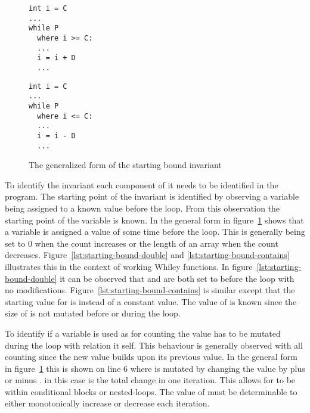 \begin{figure}[ht]
\noindent\begin{minipage}{.45\textwidth}
\begin{lstlisting}
int i = C
...
while P
  where i >= C:
  ... 
  i = i + D
  ...
\end{lstlisting}

\end{minipage}\hfill
\begin{minipage}{.45\textwidth}
\begin{lstlisting}
int i = C
...
while P
  where i <= C:
  ... 
  i = i - D
  ...
\end{lstlisting}	
\end{minipage}\hfill
\caption{The generalized form of the starting bound invariant}
\label{lst:starting-bound-gen}
\end{figure}

To identify the invariant each component of it needs to be identified in the program.
The starting point of the invariant is identified by observing a variable being
assigned to a known value before the loop.
From this observation the starting point of the variable is known.
In the general form in figure~\ref{lst:starting-bound-gen} shows that a variable  
is assigned a value of  some time before the loop.
This is generally being set to 0 when the count increases or the length of
an array when the count decreases.
Figure~\ref{lst:starting-bound-double} and \ref{lst:starting-bound-contains} illustrates this
in the context of working Whiley functions.
In figure~\ref{lst:starting-bound-double} it can be observed
that  and  are both set to  before the loop with no modifications.
Figure~\ref{lst:starting-bound-contains} is similar except that 
the starting value for  is 
instead of a constant value. The value of  is known since the 
size of  is not mutated before or during the loop.

To identify if a variable is used as for counting the value has to be
mutated during the loop with relation it self.
This behaviour is generally observed with all counting since the 
new value builds upon its previous value.
In the general form in figure~\ref{lst:starting-bound-gen} this is
shown on line 6 where  is mutated by changing the value by plus or minus
.
 in this case is the total change in one iteration.
This allows for  to be within conditional blocks or nested-loops.
The value of  must be determinable to either monotonically increase or decrease  each iteration.


